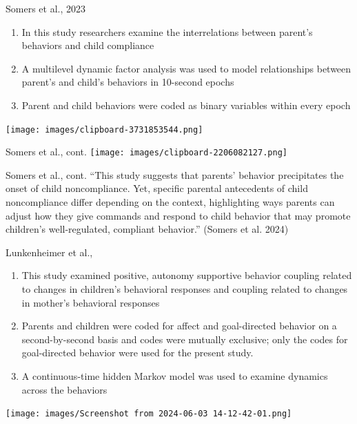 \documentclass[
  ignorenonframetext,
]{beamer}
\providecommand{\tightlist}{%
  \setlength{\itemsep}{0pt}\setlength{\parskip}{0pt}}
\begin{document}
\begin{frame}{Somers et al., 2023}
\label{somers-et-al.-2023}
\begin{enumerate}
\item
  In this study researchers examine the interrelations between parent's
  behaviors and child compliance
\item
  A multilevel dynamic factor analysis was used to model relationships
  between parent's and child's behaviors in 10-second epochs
\item
  Parent and child behaviors were coded as binary variables within every
  epoch
\end{enumerate}

\texttt{[image: images/clipboard-3731853544.png]}
\end{frame}

\begin{frame}{Somers et al., cont.}
\label{somers-et-al.-cont.}
\texttt{[image: images/clipboard-2206082127.png]}
\end{frame}

\begin{frame}{Somers et al., cont.}
\label{somers-et-al.-cont.-1}
``This study suggests that parents' behavior precipitates the onset of
child noncompliance. Yet, specific parental antecedents of child
noncompliance differ depending on the context, highlighting ways parents
can adjust how they give commands and respond to child behavior that may
promote children's well-regulated, compliant behavior.'' (Somers et al.
2024)
\end{frame}

\begin{frame}{Lunkenheimer et al.,}
\label{lunkenheimer-et-al.}
\begin{enumerate}
\tightlist
\item
  This study examined positive, autonomy supportive behavior coupling
  related to changes in children's behavioral responses and coupling
  related to changes in mother's behavioral responses
\item
  Parents and children were coded for affect and goal-directed behavior
  on a second-by-second basis and codes were mutually exclusive; only
  the codes for goal-directed behavior were used for the present study.
\item
  A continuous-time hidden Markov model was used to examine dynamics
  across the behaviors
\end{enumerate}

\texttt{[image: images/Screenshot from 2024-06-03 14-12-42-01.png]}
\end{frame}
\end{document}
